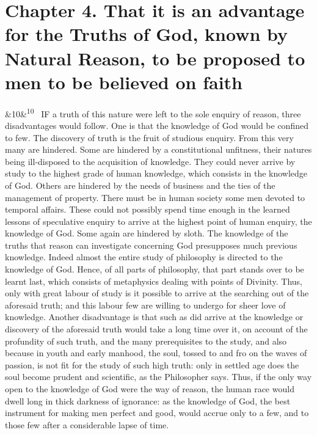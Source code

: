 \documentclass[12pt]{article}
\newcommand{\para}[1][]{\par\noindent\ifx&#1&\else\textsuperscript{\footnotesize #1}~\fi}
\begin{document}
\section*{Chapter 4. That it is an advantage for the Truths of God, known by Natural Reason, to be proposed to men to be believed on faith}

\para[10] IF a truth of this nature were left to the sole enquiry of reason, three disadvantages would follow. One is that the knowledge of God would be confined to few. The discovery of truth is the fruit of studious enquiry. From this very many are hindered. Some are hindered by a constitutional unfitness, their natures being ill-disposed to the acquisition of knowledge. They could never arrive by study to the highest grade of human knowledge, which consists in the knowledge of God. Others are hindered by the needs of business and the ties of the management of property. There must be in human society some men devoted to temporal affairs. These could not possibly spend time enough in the learned lessons of speculative enquiry to arrive at the highest point of human enquiry, the knowledge of God. Some again are hindered by sloth. The knowledge of the truths that reason can investigate concerning God presupposes much previous knowledge. Indeed almost the entire study of philosophy is directed to the knowledge of God. Hence, of all parts of philosophy, that part stands over to be learnt last, which consists of metaphysics dealing with points of Divinity. Thus, only with great labour of study is it possible to arrive at the searching out of the aforesaid truth; and this labour few are willing to undergo for sheer love of knowledge. Another disadvantage is that such as did arrive at the knowledge or discovery of the aforesaid truth would take a long time over it, on account of the profundity of such truth, and the many prerequisites to the study, and also because in youth and early manhood, the soul, tossed to and fro on the waves of passion, is not fit for the study of such high truth: only in settled age does the soul become prudent and scientific, as the Philosopher says. Thus, if the only way open to the knowledge of God were the way of reason, the human race would dwell long in thick darkness of ignorance: as the knowledge of God, the best instrument for making men perfect and good, would accrue only to a few, and to those few after a considerable lapse of time.
\end{document}
